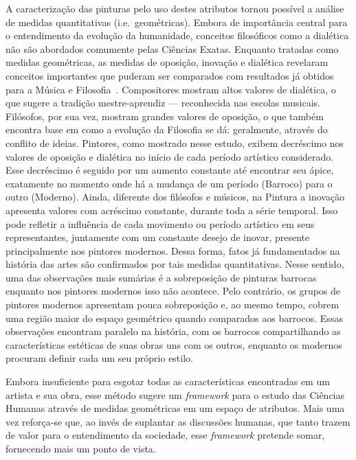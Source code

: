 A caracterização das pinturas pelo uso destes atributos tornou
possível a análise de medidas quantitativas (i.e.\ geométricas). Embora de
importância central para o entendimento da evolução da humanidade,
conceitos filosóficos como a dialética não são abordados comumente
pelas Ciências Exatas. Enquanto tratadas como medidas geométricas, as
medidas de oposição, inovação e dialética revelaram conceitos
importantes que puderam ser comparados com resultados já obtidos para
a Música e Filosofia~\cite{vieira}. Compositores mostram altos valores
de dialética, o que sugere a tradição mestre-aprendiz --- reconhecida
nas escolas musicais. Filósofos, por sua vez, mostram grandes valores
de oposição, o que também encontra base em como a evolução da
Filosofia se dá: geralmente, através do conflito de ideias. Pintores,
como mostrado nesse estudo, exibem decréscimo nos valores de oposição
e dialética no início de cada período artístico considerado. Esse
decréscimo é seguido por um aumento constante até encontrar seu ápice,
exatamente no momento onde há a mudança de um período (Barroco) para o
outro (Moderno). Ainda, diferente dos filósofos e músicos, na Pintura
a inovação apresenta valores com acréscimo constante, durante toda a
série temporal. Isso pode refletir a influência de cada movimento ou
período artístico em seus representantes, juntamente com um constante
desejo de inovar, presente principalmente nos pintores modernos. Dessa
forma, fatos já fundamentados na história das artes são confirmados
por tais medidas quantitativas. Nesse sentido, uma das observações
mais sumárias é a sobreposição de pinturas barrocas enquanto nos
pintores modernos isso não acontece. Pelo contrário, os grupos de
pintores modernos apresentam pouca sobreposição e, ao mesmo tempo,
cobrem uma região maior do espaço geométrico quando comparados aos
barrocos. Essas observações encontram paralelo na história, com os
barrocos compartilhando as características estéticas de suas obras uns
com os outros, enquanto os modernos procuram definir cada um seu
próprio estilo.

Embora insuficiente para esgotar todas as características encontradas
em um artista e sua obra, esse método sugere um \textit{framework}
para o estudo das Ciências Humanas através de medidas geométricas em
um espaço de atributos. Mais uma vez reforça-se que, ao invés de
suplantar as discussões humanas, que tanto trazem de valor para o
entendimento da sociedade, esse \textit{framework} pretende somar,
fornecendo mais um ponto de vista.

